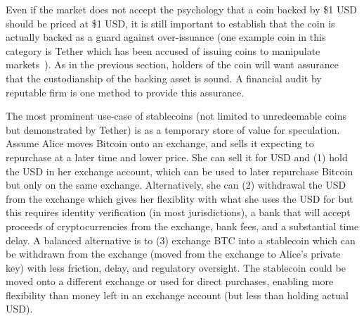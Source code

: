 
Even if the market does not accept the psychology that a coin backed by \$1 USD should be priced at \$1 USD, it is still important to establish that the coin is actually backed as a guard against over-issuance (one example coin in this category is Tether which has been accused of issuing coins to manipulate markets~\cite{griffin2018bitcoin}). As in the previous section, holders of the coin will want assurance that the custodianship of the backing asset is sound. A financial audit by reputable firm is one method to provide this assurance.

The most prominent use-case of stablecoins (not limited to unredeemable coins but demonstrated by Tether) is as a temporary store of value for speculation. Assume Alice moves Bitcoin onto an exchange, and sells it expecting to repurchase at a later time and lower price. She can sell it for USD and (1) hold the USD in her exchange account, which can be used to later repurchase Bitcoin but only on the same exchange. Alternatively, she can (2) withdrawal the USD from the exchange which gives her flexiblity with what she uses the USD for but this requires identity verification (in most jurisdictions), a bank that will accept proceeds of cryptocurrencies from the exchange, bank fees, and a substantial time delay. A balanced alternative is to (3) exchange BTC into a stablecoin which can be withdrawn from the exchange (\ie moved from the exchange to Alice's private key) with less friction, delay, and regulatory oversight. The stablecoin could be moved onto a different exchange or used for direct purchases, enabling more flexibility than money left in an exchange account (but less than holding actual USD).






